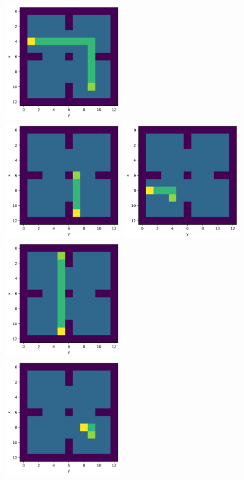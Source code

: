 \documentclass[12pt]{article}
\begin{document}
\includegraphics[height= 5cm, width=5cm]{p3-2-5}
\\

\includegraphics[height= 5cm, width=5cm]{p3-2-6}
\includegraphics[height= 5cm, width=5cm]{p3-2-7}
\includegraphics[height= 5cm, width=5cm]{p3-2-8}
\\
\includegraphics[height= 5cm, width=5cm]{p3-2-9}
\end{document}
